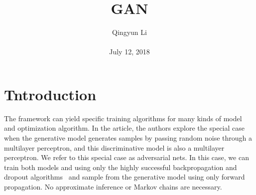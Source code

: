 \documentclass[10pt,twocolumn,letterpaper]{article}
\begin{document}
\author{Qingyun Li\\\\
July 12, 2018}        
\title{GAN}

\maketitle

\section{Tntroduction}
\par The  framework can yield specific training algorithms for many kinds of model and optimization algorithm. In the article, the authors explore the special case when the generative model generates samples by passing random noise through a multilayer perceptron, and this discriminative model is also a multilayer perceptron. We refer to this special case as adversarial nets. In this case, we can train both models and using only the highly successful backpropagation and dropout algorithms~\cite{Hinton2012Improving} and sample from the generative model using only forward propagation. No approximate inference or Markov chains are necessary.
\end{document}
